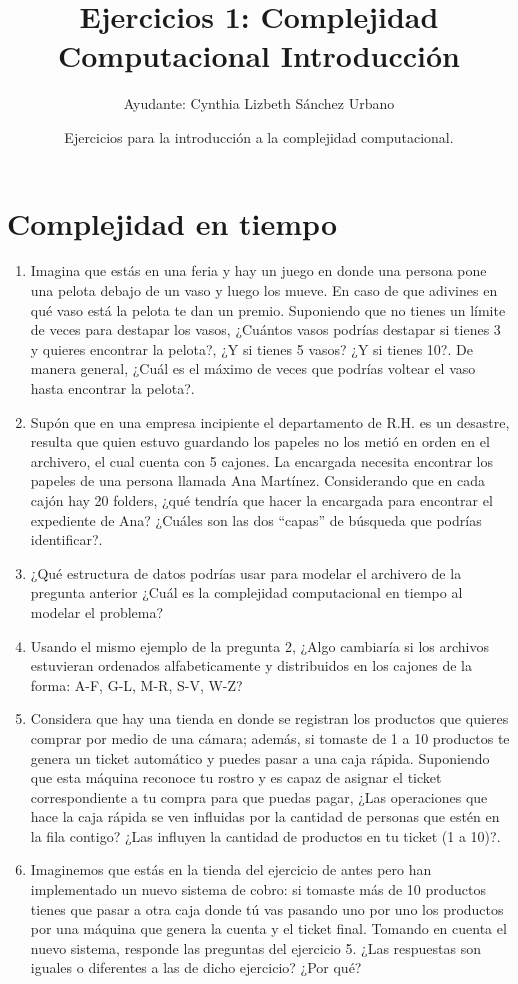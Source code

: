 \documentclass[12pt]{article} %
\begin{document}
\title{Ejercicios 1: Complejidad Computacional Introducción}
\author{Ayudante: Cynthia Lizbeth Sánchez Urbano}
\date{Ejercicios para la introducción a la complejidad computacional.}
\maketitle
\section{Complejidad en tiempo}

\begin{enumerate}
\item Imagina que estás en una feria y hay un juego en donde una persona pone una pelota debajo de un vaso y luego los mueve. En caso de que adivines en qué vaso está la pelota te dan un premio. Suponiendo que no tienes un límite de veces para destapar los vasos, ¿Cuántos vasos podrías destapar si tienes 3 y quieres encontrar la pelota?, ¿Y si tienes 5 vasos? ¿Y si tienes 10?. De manera general, ¿Cuál es el máximo de veces que podrías voltear el vaso hasta encontrar la pelota?.
\item Supón que en una empresa incipiente el departamento de R.H. es un desastre, resulta que quien estuvo guardando los papeles no los metió en orden en el archivero, el cual cuenta con 5 cajones. La encargada necesita encontrar los papeles de una persona llamada Ana Martínez. Considerando que en cada cajón hay 20 folders, ¿qué tendría que hacer la encargada para encontrar el expediente de Ana?
¿Cuáles son las dos ``capas'' de búsqueda que podrías identificar?.
\item ¿Qué estructura de datos podrías usar para modelar el archivero de la pregunta anterior ¿Cuál es la complejidad computacional en tiempo al modelar el problema? 
\item Usando el mismo ejemplo de la pregunta 2, ¿Algo cambiaría si los archivos estuvieran ordenados alfabeticamente y distribuidos en los cajones de la forma: A-F, G-L, M-R, S-V, W-Z?
\item Considera que hay una tienda en donde se registran los productos que quieres comprar por medio de una cámara; además, si tomaste de 1 a 10 productos te genera un ticket automático y puedes pasar a una caja rápida. Suponiendo que esta máquina reconoce tu rostro y es capaz de asignar el ticket correspondiente a tu compra para que puedas pagar, ¿Las operaciones que hace la caja rápida se ven influidas por la cantidad de personas que estén en la fila contigo? ¿Las influyen la cantidad de productos en tu ticket (1 a 10)?.
\item Imaginemos que estás en la tienda del ejercicio de antes pero han implementado un nuevo sistema de cobro: si tomaste más de 10 productos tienes que pasar a otra caja donde tú vas pasando uno por uno los productos por una máquina que genera la cuenta y el ticket final. Tomando en cuenta el nuevo sistema, responde las preguntas del ejercicio 5. ¿Las respuestas son iguales o diferentes a las de dicho ejercicio? ¿Por qué?
\end{enumerate}
\end{document}
